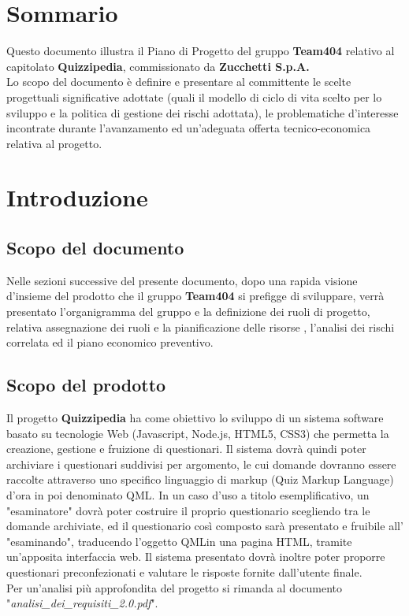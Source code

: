 \documentclass[a4paper,11pt]{article}
\begin{document}
	\section{Sommario}
	Questo documento illustra il Piano di Progetto del gruppo \textbf{Team404} relativo al capitolato \textbf{Quizzipedia}, commissionato da \textbf{Zucchetti S.p.A.}
	\\
	Lo scopo del documento è definire e presentare al committente le scelte progettuali significative adottate (quali il modello di ciclo di vita scelto per lo sviluppo e la politica di gestione dei rischi adottata), le problematiche d'interesse incontrate durante l'avanzamento ed un'adeguata offerta tecnico-economica relativa al progetto.
	
	\newpage
	\section{Introduzione}
	\subsection{Scopo del documento}
	Nelle sezioni successive del presente documento, dopo una rapida visione d'insieme del prodotto che il gruppo \textbf{Team404} si prefigge di sviluppare, verrà presentato l'organigramma del gruppo e la definizione dei ruoli di progetto, relativa assegnazione dei ruoli e la pianificazione delle risorse , l'analisi dei rischi correlata ed il piano economico preventivo.
	\subsection{Scopo del prodotto}
	Il progetto \textbf{Quizzipedia} ha come obiettivo lo sviluppo di un sistema software basato su tecnologie Web (Javascript\addglos, Node.js\addglos, HTML5\addglos, CSS3\addglos) che permetta la creazione, gestione e fruizione di questionari. Il sistema dovrà quindi poter archiviare i questionari suddivisi per argomento, le cui domande dovranno essere raccolte attraverso uno specifico linguaggio di markup (Quiz Markup Language) d'ora in poi denominato QML\addglos. In un caso d'uso a titolo esemplificativo, un "esaminatore" dovrà poter costruire il proprio questionario scegliendo tra le domande archiviate, ed il questionario così composto sarà presentato e fruibile all' "esaminando", traducendo l'oggetto QML\addglos in una pagina HTML\addglos, tramite un'apposita interfaccia web. Il sistema presentato dovrà inoltre poter proporre questionari preconfezionati e valutare le risposte fornite dall'utente finale.
	\\
	Per un'analisi più approfondita del progetto si rimanda al documento "\textit{analisi\_dei\_requisiti\_2.0.pdf}".
\end{document}
